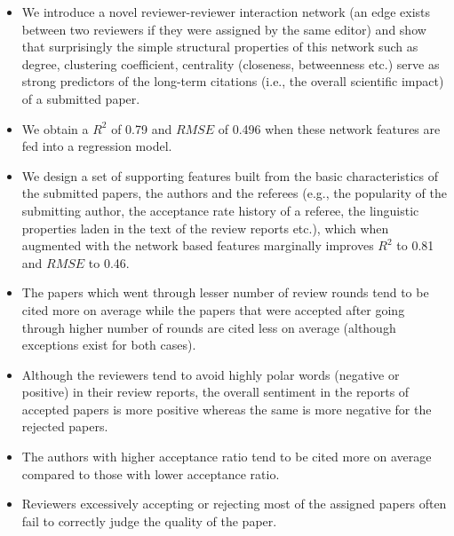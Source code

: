 \begin{itemize}
 \item We introduce a novel reviewer-reviewer interaction network (an edge exists between two reviewers if they were assigned by
the same editor) and show that surprisingly the simple structural properties of this network such as degree, clustering coefficient,
centrality (closeness, betweenness etc.) serve as strong predictors of the long-term citations (i.e., the overall scientific impact) of a
submitted paper. 
  \item We obtain a $R^2$ of 0.79 and $RMSE$ of 0.496 when these network features are fed into a regression model.
  
  \item We design a set of supporting features built from the basic characteristics of
the submitted papers, the authors and the referees (e.g., the popularity of the submitting author, the acceptance rate history of a
referee, the linguistic properties laden in the text of the review reports etc.), which when augmented with the network based features marginally improves 
$R^2$ to 0.81 and $RMSE$ to 0.46.

  \item The papers which went through lesser number of review rounds tend to be cited more on average while the papers that were
accepted after going through higher number of rounds are cited less on average (although exceptions exist for both cases).

 \item Although the reviewers tend to avoid highly polar words (negative or positive) in their review reports, the overall sentiment in the reports
of accepted papers is more positive whereas the same is more negative for the rejected papers.

 \item The authors with higher acceptance ratio tend to be cited more on average compared to those with lower acceptance ratio.

 \item Reviewers excessively accepting or rejecting most of the assigned papers often fail to correctly judge the
quality of the paper.
\end{itemize}


